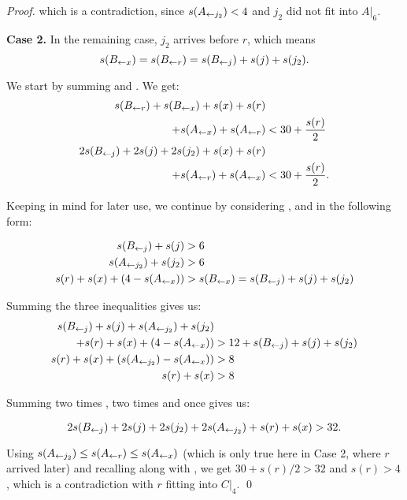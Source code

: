 \begin{proof}
which is a contradiction, since $s(A_{\leftarrow j_2}) < 4$ and $j_2$ did not fit into $A|_{6}$.

\smallskip

\noindent \textbf{Case 2.} In the remaining case, $j_2$ arrives before $r$, which means
\[ s(B_{\leftarrow x}) = s(B_{\leftarrow r}) = s(B_{\leftarrow j}) + s(j) + s(j_2). \]


We start by summing  and . We get:
\begin{align}
s(B_{\leftarrow r}) + s(B_{\leftarrow x}) + s(x) + s(r) &\nonumber\\
+ s(A_{\leftarrow x}) + s(A_{\leftarrow r}) &< 30 + \frac{s(r)}{2} \nonumber \\ 
2s(B_{\leftarrow j}) + 2s(j) + 2s(j_2) + s(x) + s(r) &\nonumber\\
+ s(A_{\leftarrow r}) + s(A_{\leftarrow x}) &< 30 + \frac{s(r)}{2}. \label{eq:result1}
\end{align}

Keeping  in mind for later use, we continue
by considering ,  and  in the
following form:

\begin{align}
s(B_{\leftarrow j}) + s(j) &> 6 \label{eq:1applied}\\
s(A_{\leftarrow j_2}) + s(j_2) &> 6 \label{eq:2applied}\\
s(r) + s(x) + (4 - s(A_{\leftarrow x})) &> s(B_{\leftarrow x}) = s(B_{\leftarrow j}) + s(j) + s(j_2) \nonumber
\end{align}

Summing the three inequalities gives us:
\begin{align}
s(B_{\leftarrow j}) + s(j) + s(A_{\leftarrow j_2}) + s(j_2) &\nonumber\\
+ s(r) + s(x) + (4 - s(A_{\leftarrow x})) &> 12 + s(B_{\leftarrow j}) + s(j) + s(j_2)\nonumber\\
s(r) + s(x) + \left( s(A_{\leftarrow j_2}) - s(A_{\leftarrow x}) \right) &> 8 \nonumber\\ 
s(r) + s(x) &> 8\label{eq:result3}
\end{align}

Summing two times , two times
 and once  gives us:

\begin{equation}\label{eq:result2}
2s(B_{\leftarrow j}) + 2s(j) + 2s(j_2) + 2s(A_{\leftarrow j_2}) + s(r) + s(x) > 32.
\end{equation}

Using $s(A_{\leftarrow j_2}) \le s(A_{\leftarrow r}) \le s(A_{\leftarrow x})$ (which is only true here
in Case 2, where $r$ arrived later) and recalling
 along with , we get $30 +
s(r)/2 > 32$ and $s(r) > 4$, which is a contradiction with $r$ fitting into
$C|_4$. \qed

\end{proof}

